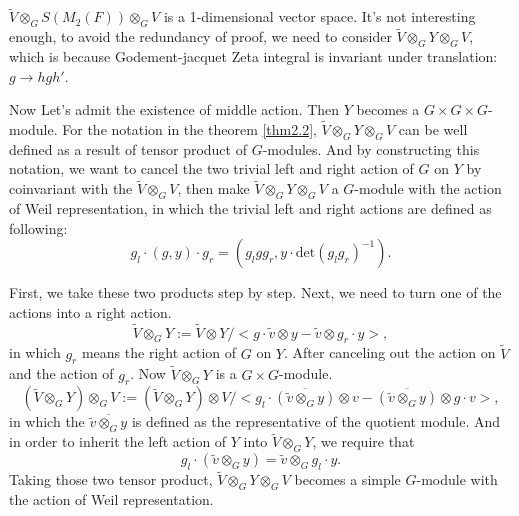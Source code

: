 \documentclass[12pt,a4paper,english]{article}
\theoremstyle{plain}
\theoremstyle{definition}
\begin{document}
 $\widetilde{V}\otimes_{G}S(M_{2}(F))\otimes_{G}V$ is a 1-dimensional vector space. It's not interesting enough, to avoid the redundancy of proof, we need to consider  $\widetilde{V}\otimes_{G}Y\otimes_{G}V$, which is because Godement-jacquet Zeta integral is invariant under translation: $g\rightarrow hgh'$.

Now Let's admit the existence of middle action. Then $Y$ becomes a $G\times G\times G$-module. For the notation in the theorem \ref{thm2.2}, $\widetilde{V}\otimes_{G}Y\otimes_{G}V$ can be well defined as a result of tensor product of $ G$-modules. And by constructing this notation, we want to cancel the two trivial left and right action of $G$ on $Y$ by coinvariant with the $\widetilde{V}\otimes_{G}V$, then make $\widetilde{V}\otimes_{G}Y\otimes_{G}V$ a $G$-module with the action of Weil representation, in which the trivial left and right actions are defined as following:
\begin{equation*}
    g_{l}\cdot (g,y)\cdot g_{r}=(g_{l}gg_{r},y\cdot \text{det}(g_{l}g_{r})^{-1}).
\end{equation*}



First, we take these two products step by step. Next, we need to turn one of the actions into a right action. 
\begin{equation*}
    \widetilde{V}\otimes_{G}Y := \widetilde{V}\otimes Y/<g\cdot\tilde{v}\otimes y-\tilde{v}\otimes g_{r}\cdot y>,
\end{equation*}
in which $g_{r}$ means the right action of $G$ on $Y$. After canceling out the action on $\tilde{V}$ and the action of $g_{r}$. Now $\tilde{V}\otimes_{G}Y$ is a $G\times G$-module.
\begin{equation*}
    (\widetilde{V}\otimes_{G}Y)\otimes_{G} V:= (\widetilde{V}\otimes_{G}Y)\otimes V/<g_{l}\cdot\overline{(\tilde{v}\otimes_{G} y)}\otimes v-\overline{(\tilde{v}\otimes_{G} y)}\otimes g\cdot v>,
\end{equation*}
in which the $\overline{\tilde{v}\otimes_{G} y}$ is defined as the representative of the quotient module. And in order to inherit the left action of $Y$ into $\widetilde{V}\otimes_{G}Y$, we require that
\begin{equation*}
    g_{l}\cdot(\tilde{v}\otimes_{G} y)=\tilde{v}\otimes_{G} g_{l}\cdot y.
\end{equation*}
Taking those two tensor product, $\widetilde{V}\otimes_{G}Y\otimes_{G} V$ becomes a simple $G$-module with the action of Weil representation.
\end{document}
